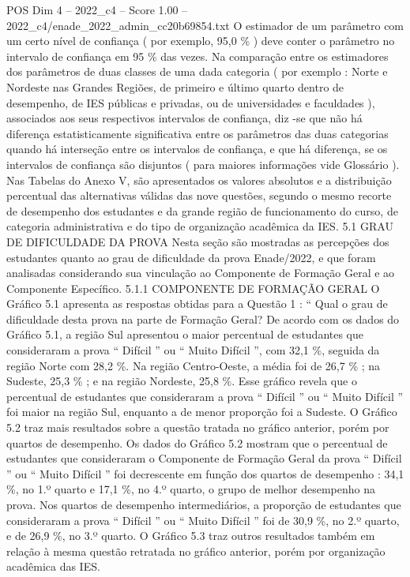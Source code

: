 \begin{textsample}{POS Dim 4 – 2022\_c4 – Score 1.00 – 2022\_c4/enade\_2022\_admin\_cc20b69854.txt}
O estimador de um parâmetro com um certo nível de confiança ( por exemplo, 95,0 \% ) deve conter o parâmetro no intervalo de confiança em 95 \% das vezes.
Na comparação entre os estimadores dos parâmetros de duas classes de uma dada categoria ( por exemplo : Norte e Nordeste nas Grandes Regiões, de primeiro e último quarto dentro de desempenho, de IES públicas e privadas, ou de universidades e faculdades ), associados aos seus respectivos intervalos de confiança, diz -se que não há diferença estatisticamente significativa entre os parâmetros das duas categorias quando há interseção entre os intervalos de confiança, e que há diferença, se os intervalos de confiança são disjuntos ( para maiores informações vide Glossário ).
Nas Tabelas do Anexo V, são apresentados os valores absolutos e a distribuição percentual das alternativas válidas das nove questões, segundo o mesmo recorte de desempenho dos estudantes e da grande região de funcionamento do curso, de categoria administrativa e do tipo de organização acadêmica da IES. 5.1 GRAU DE DIFICULDADE DA PROVA Nesta seção são mostradas as percepções dos estudantes quanto ao grau de dificuldade da prova Enade/2022, e que foram analisadas considerando sua vinculação ao Componente de Formação Geral e ao Componente Específico. 5.1.1 COMPONENTE DE FORMAÇÃO GERAL O Gráfico 5.1 apresenta as respostas obtidas para a Questão 1 : “ Qual o grau de dificuldade desta prova na parte de Formação Geral?
De acordo com os dados do Gráfico 5.1, a região Sul apresentou o maior percentual de estudantes que consideraram a prova “ Difícil ” ou “ Muito Difícil ”, com 32,1 \%, seguida da região Norte com 28,2 \%.
Na região Centro-Oeste, a média foi de 26,7 \% ; na Sudeste, 25,3 \% ; e na região Nordeste, 25,8 \%.
Esse gráfico revela que o percentual de estudantes que consideraram a prova “ Difícil ” ou “ Muito Difícil ” foi maior na região Sul, enquanto a de menor proporção foi a Sudeste.
O Gráfico 5.2 traz mais resultados sobre a questão tratada no gráfico anterior, porém por quartos de desempenho.
Os dados do Gráfico 5.2 mostram que o percentual de estudantes que consideraram o Componente de Formação Geral da prova “ Difícil ” ou “ Muito Difícil ” foi decrescente em função dos quartos de desempenho : 34,1 \%, no 1.º quarto e 17,1 \%, no 4.º quarto, o grupo de melhor desempenho na prova.
Nos quartos de desempenho intermediários, a proporção de estudantes que consideraram a prova “ Difícil ” ou “ Muito Difícil ” foi de 30,9 \%, no 2.º quarto, e de 26,9 \%, no 3.º quarto.
O Gráfico 5.3 traz outros resultados também em relação à mesma questão retratada no gráfico anterior, porém por organização acadêmica das IES.

\end{textsample}

